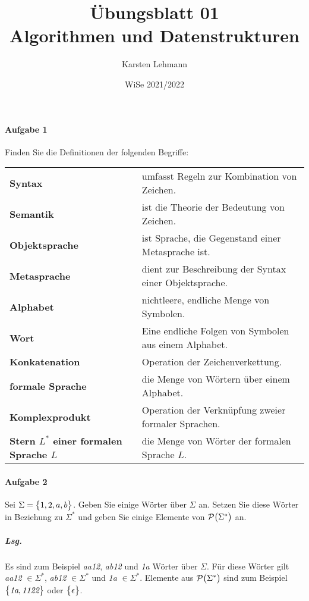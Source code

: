 \documentclass{scrreprt}
\author{Karsten Lehmann}
\date{WiSe 2021/2022}
\title{Übungsblatt 01\\Algorithmen und Datenstrukturen}
\begin{document}
\paragraph{Aufgabe 1} Finden Sie die Definitionen der folgenden Begriffe:

\begin{tabular}{l l}
  \textbf{Syntax} & umfasst Regeln zur Kombination von Zeichen. \\
  \textbf{Semantik} & ist die Theorie der Bedeutung von Zeichen. \\
  \textbf{Objektsprache} & ist Sprache, die Gegenstand einer Metasprache ist. \\
  \textbf{Metasprache} & dient zur Beschreibung der Syntax einer Objektsprache. \\
  \textbf{Alphabet} & nichtleere, endliche Menge von Symbolen. \\
  \textbf{Wort} & Eine endliche Folgen von Symbolen aus einem Alphabet. \\
  \textbf{Konkatenation} & Operation der Zeichenverkettung. \\
  \textbf{formale Sprache} & die Menge von Wörtern über einem Alphabet. \\
  \textbf{Komplexprodukt} & Operation der Verknüpfung zweier formaler Sprachen. \\
  \textbf{Stern $L^*$ einer formalen Sprache $L$} & die Menge von Wörter der formalen Sprache $L$. \\
\end{tabular}

\paragraph{Aufgabe 2} Sei $\Sigma = \qty\big{1, 2, a, b}$.
Geben Sie einige Wörter über $\Sigma$ an.
Setzen Sie diese Wörter in Beziehung zu $\Sigma^*$ und geben Sie einige Elemente
von $\mathcal{P}\qty\big(\Sigma^*)$ an.

\subparagraph{Lsg.} Es sind zum Beispiel \emph{aa12}, \emph{ab12} und \emph{1a}
Wörter über $\Sigma$.
Für diese Wörter gilt \emph{aa12} $\in \Sigma^*$, \emph{ab12} $\in \Sigma^*$ und
\emph{1a} $\in \Sigma^*$.
Elemente aus $\mathcal{P}\qty\big(\Sigma^*)$ sind zum Beispiel
$\qty\big{\emph{1a}, \emph{1122}}$ oder $\qty\big{\epsilon}$.
\end{document}

